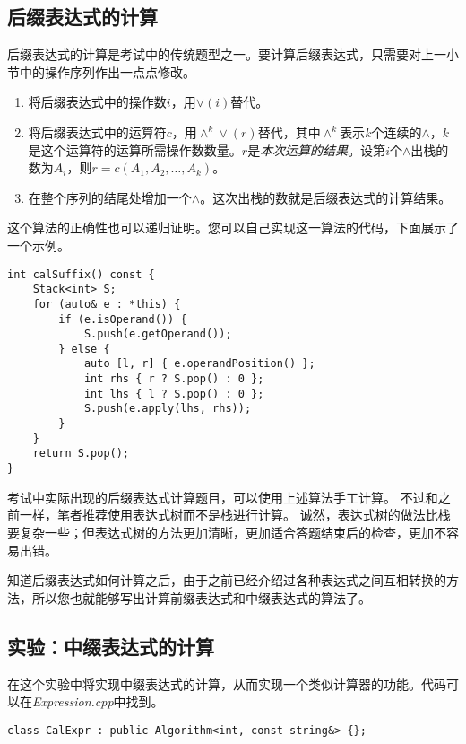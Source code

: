 \subsection{后缀表达式的计算}

后缀表达式的计算是考试中的传统题型之一。要计算后缀表达式，只需要对上一小节中的操作序列作出一点点修改。

\begin{enumerate}
    \item 将后缀表达式中的操作数$i$，用$\lor(i)$替代。
    \item 将后缀表达式中的运算符$c$，用$\land ^k \lor(r)$替代，其中$\land^k$表示$k$个连续的$\land$，$k$是这个运算符的运算所需操作数数量。$r$是\textit{本次运算的结果}。设第$i$个$\land$出栈的数为$A_i$，则$r=c(A_1,A_2,\dots,A_k)$。
    \item 在整个序列的结尾处增加一个$\land$。这次出栈的数就是后缀表达式的计算结果。
\end{enumerate}

这个算法的正确性也可以递归证明。您可以自己实现这一算法的代码，下面展示了一个示例。

\begin{lstlisting}
int calSuffix() const {
    Stack<int> S;
    for (auto& e : *this) {
        if (e.isOperand()) {
            S.push(e.getOperand());
        } else {
            auto [l, r] { e.operandPosition() };
            int rhs { r ? S.pop() : 0 };
            int lhs { l ? S.pop() : 0 };
            S.push(e.apply(lhs, rhs));
        }
    }
    return S.pop();
}
\end{lstlisting}

考试中实际出现的后缀表达式计算题目，可以使用上述算法手工计算。
不过和之前一样，笔者推荐使用表达式树而不是栈进行计算。
诚然，表达式树的做法比栈要复杂一些；但表达式树的方法更加清晰，更加适合答题结束后的检查，更加不容易出错。

知道后缀表达式如何计算之后，由于之前已经介绍过各种表达式之间互相转换的方法，所以您也就能够写出计算前缀表达式和中缀表达式的算法了。

\subsection{实验：中缀表达式的计算}
\label{sta:中缀表达式的计算}
在这个实验中将实现中缀表达式的计算，从而实现一个类似计算器的功能。代码可以在\textit{Expression.cpp}中找到。

\begin{lstlisting}
class CalExpr : public Algorithm<int, const string&> {};
\end{lstlisting}

